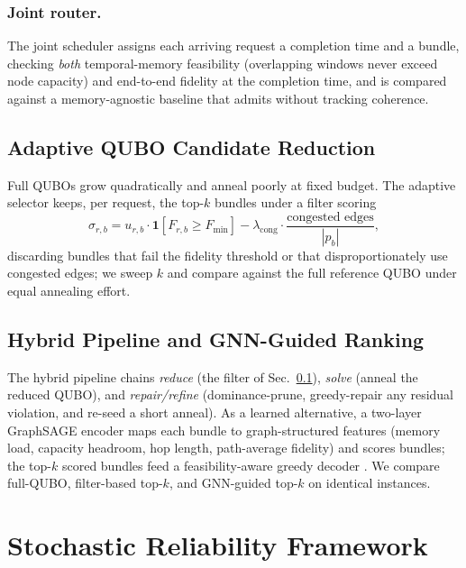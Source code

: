 \documentclass[twocolumn]{article}
\begin{document}
\subsubsection{Joint router.}
The joint scheduler assigns each arriving request a completion time and
a bundle, checking \emph{both} temporal-memory feasibility
(overlapping windows never exceed node capacity) and end-to-end
fidelity at the completion time, and is compared against a
memory-agnostic baseline that admits without tracking coherence.

\subsection{Adaptive QUBO Candidate Reduction}
\label{sec:adaptive-qubo}

Full QUBOs grow quadratically and anneal poorly at fixed budget.  The
adaptive selector keeps, per request, the top-$k$ bundles under a
filter scoring
\begin{equation}
  \sigma_{r,b} = u_{r,b} \cdot \mathbf{1}[F_{r,b} \ge F_{\min}]
    - \lambda_{\text{cong}} \cdot \frac{\text{congested edges}}{|p_b|},
\end{equation}
discarding bundles that fail the fidelity threshold or that
disproportionately use congested edges; we sweep $k$ and compare
against the full reference QUBO under equal annealing effort.

\subsection{Hybrid Pipeline and GNN-Guided Ranking}
\label{sec:hybrid}

The hybrid pipeline chains \emph{reduce} (the filter of
Sec.~\ref{sec:adaptive-qubo}), \emph{solve} (anneal the reduced
QUBO), and \emph{repair/refine} (dominance-prune, greedy-repair any
residual violation, and re-seed a short anneal).  As a learned
alternative, a two-layer GraphSAGE encoder maps each bundle to
graph-structured features (memory load, capacity headroom, hop length,
path-average fidelity) and scores bundles; the top-$k$ scored bundles
feed a feasibility-aware greedy decoder
\cite{rusek2020routenets,mao2017routing}.  We compare full-QUBO,
filter-based top-$k$, and GNN-guided top-$k$ on identical instances.

\section{Stochastic Reliability Framework}
\label{sec:reliability}
\end{document}
